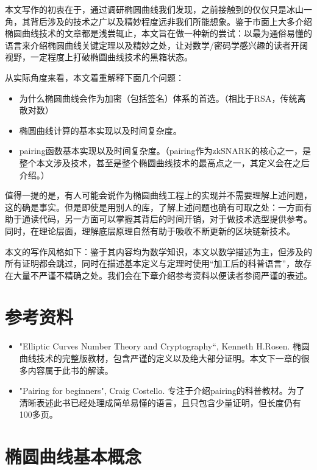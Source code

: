\documentclass[12pt]{article}
\begin{document}
本文写作的初衷在于，通过调研椭圆曲线我们发现，之前接触到的仅仅只是冰山一角，其背后涉及的技术之广以及精妙程度远非我们所能想象。鉴于市面上大多介绍椭圆曲线技术的文章都是浅尝辄止，本文旨在做一种新的尝试：以最为通俗易懂的语言来介绍椭圆曲线关键定理以及精妙之处，让对数学/密码学感兴趣的读者开阔视野，一定程度上打破椭圆曲线技术的黑箱状态。

从实际角度来看，本文着重解释下面几个问题：
\begin{itemize}
	\item 为什么椭圆曲线会作为加密（包括签名）体系的首选。（相比于RSA，传统离散对数）
	\item 椭圆曲线计算的基本实现以及时间复杂度。
	\item pairing函数基本实现以及时间复杂度。（pairing作为zkSNARK的核心之一，是整个本文涉及技术，甚至是整个椭圆曲线技术的最高点之一，其定义会在之后介绍。）
\end{itemize}
值得一提的是，有人可能会说作为椭圆曲线工程上的实现并不需要理解上述问题，这的确是事实。但是即使是用别人的库，了解上述问题也确有可取之处：一方面有助于通读代码，另一方面可以掌握其背后的时间开销，对于做技术选型提供参考。同时，在理论层面，理解底层原理自然有助于吸收不断更新的区块链新技术。

本文的写作风格如下：鉴于其内容均为数学知识，本文以数学描述为主，但涉及的所有证明都会跳过，同时在描述基本定义与定理时使用“加工后的科普语言”，故存在大量不严谨不精确之处。我们会在下章介绍参考资料以便读者参阅严谨的表述。
\section{参考资料}
\begin{itemize}
\item "Elliptic Curves Number Theory and Cryptography“, Kenneth H.Rosen. 椭圆曲线技术的完整版教材，包含严谨的定义以及绝大部分证明。本文下一章的很多内容属于此书的解读。
\item "Pairing for beginners", Craig Costello. 专注于介绍pairing的科普教材。为了清晰表述此书已经处理成简单易懂的语言，且只包含少量证明，但长度仍有100多页。
\end{itemize}
\section{椭圆曲线基本概念}
\end{document}
